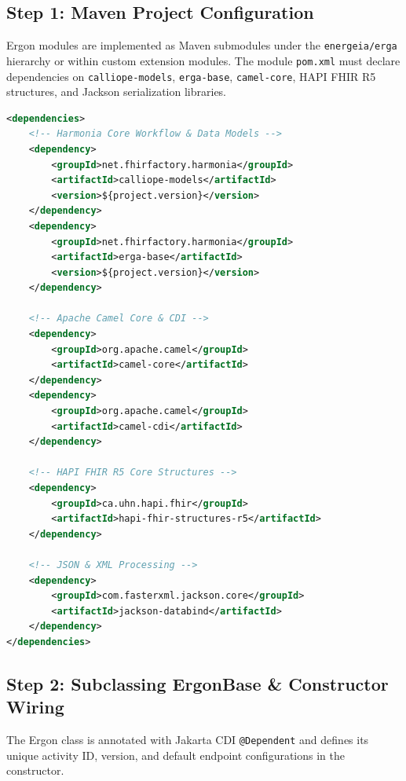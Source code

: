 \subsection{Step 1: Maven Project Configuration}

Ergon modules are implemented as Maven submodules under the \texttt{energeia/erga} hierarchy or within custom extension modules. The module \texttt{pom.xml} must declare dependencies on \texttt{calliope-models}, \texttt{erga-base}, \texttt{camel-core}, HAPI FHIR R5 structures, and Jackson serialization libraries.

\begin{lstlisting}[language=XML, caption={Maven Dependencies for an Ergon Module (pom.xml)}]
<dependencies>
    <!-- Harmonia Core Workflow & Data Models -->
    <dependency>
        <groupId>net.fhirfactory.harmonia</groupId>
        <artifactId>calliope-models</artifactId>
        <version>${project.version}</version>
    </dependency>
    <dependency>
        <groupId>net.fhirfactory.harmonia</groupId>
        <artifactId>erga-base</artifactId>
        <version>${project.version}</version>
    </dependency>

    <!-- Apache Camel Core & CDI -->
    <dependency>
        <groupId>org.apache.camel</groupId>
        <artifactId>camel-core</artifactId>
    </dependency>
    <dependency>
        <groupId>org.apache.camel</groupId>
        <artifactId>camel-cdi</artifactId>
    </dependency>

    <!-- HAPI FHIR R5 Core Structures -->
    <dependency>
        <groupId>ca.uhn.hapi.fhir</groupId>
        <artifactId>hapi-fhir-structures-r5</artifactId>
    </dependency>

    <!-- JSON & XML Processing -->
    <dependency>
        <groupId>com.fasterxml.jackson.core</groupId>
        <artifactId>jackson-databind</artifactId>
    </dependency>
</dependencies>
\end{lstlisting}

\subsection{Step 2: Subclassing ErgonBase \& Constructor Wiring}

The Ergon class is annotated with Jakarta CDI \texttt{@Dependent} and defines its unique activity ID, version, and default endpoint configurations in the constructor.

